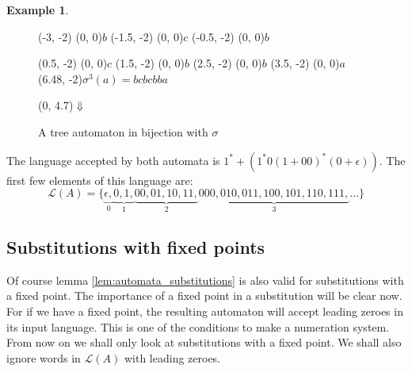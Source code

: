 \documentclass{article}
\theoremstyle{definition}
\newtheorem{example}[theorem]{Example}
\begin{document}
\begin{example}
\begin{figure}[t]
\begin{graph}
  (-3, -2)  (0, 0){$b$} %
  (-1.5, -2)  (0, 0){$c$}
  (-0.5, -2) (0, 0){$b$}

  (0.5, -2)  (0, 0){$c$}
  (1.5, -2)  (0, 0){$b$}
  (2.5, -2)  (0, 0){$b$}
  (3.5, -2)  (0, 0){$a$}
  \freetext(6.48, -2){$\sigma^3(a) = bcbcbba$}

   
   

   
   
   
   

   
   
   
   
   
   
   

  \freetext(0, 4.7){$\Downarrow$}
\end{graph}
\caption{A tree automaton in bijection with $\sigma$}
\label{fig:automata_tree_substitutions}
\end{figure}
The language accepted by both automata is 
$1^* + (1^* 0 (1 + 00)^* (0 + \epsilon))$. The first few elements of this
language are:
\begin{displaymath}
\mathcal{L}(A) = \{\underbrace{\epsilon,}_0
\underbrace{0, 1,}_1
\underbrace{00, 01, 10, 11,}_ 2
\underbrace{000, 010, 011, 100, 101, 110, 111,}_3 \ldots\}
\end{displaymath}
\end{example}

\subsection{Substitutions with fixed points} 
Of course lemma \ref{lem:automata_substitutions} is also valid for 
substitutions with a fixed point. The importance of a fixed point in a 
substitution will be clear now. For if we have a fixed point, the resulting 
automaton will accept leading zeroes in its input language. This is one of the 
conditions to make a numeration system. From now on we shall only look at 
substitutions with a fixed point. We shall also ignore words in 
$\mathcal{L}(A)$ with leading zeroes.
\end{document}
